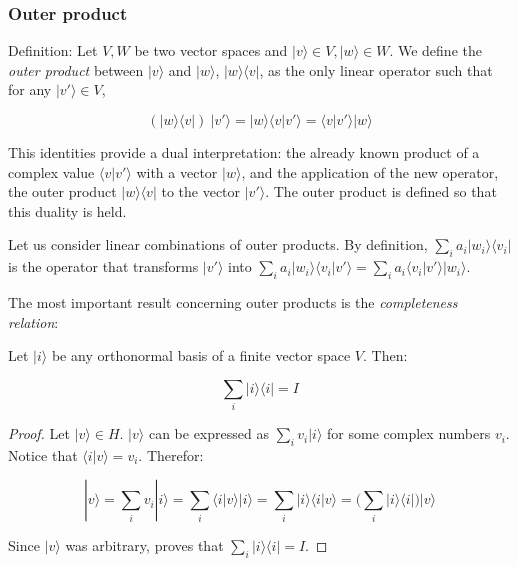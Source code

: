 \documentclass{article}
\begin{document}
	
	\subsubsection{Outer product}
	
	
	\begin{definition}
		Definition: Let $V, W$ be two vector spaces and $|v\rangle \in V, |w\rangle \in W$. We define the \emph{outer product} between $|v\rangle$ and $|w\rangle$, $|w\rangle\langle v|$, as the only linear operator such that for any $|v'\rangle \in V$, 
		
		$$ (|w\rangle\langle v|) \ |v'\rangle = |w\rangle\langle v|v'\rangle = \langle v|v'\rangle |w\rangle$$
	\end{definition}
	
	This identities provide a dual interpretation: the already known product of a complex value $\langle v|v'\rangle$ with a vector $|w\rangle$, and the application of the new operator, the outer product $|w\rangle\langle v|$ to the vector $|v'\rangle$. The outer product is defined so that this duality is held.
	
	Let us consider linear combinations of outer products. By definition, $\sum_i a_i |w_i\rangle\langle v_i|$ is the operator that transforms $|v'\rangle$ into $\sum_i a_i |w_i\rangle\langle v_i|v'\rangle = \sum_i a_i \langle v_i|v'\rangle |w_i\rangle$.
	
	The most important result concerning outer products is the \emph{completeness relation}:
	
	\begin{proposition}
		Let $|i\rangle$ be any orthonormal basis of a finite vector space $V$. Then:
		
		$$ \sum_i |i\rangle\langle i | = I $$
	\end{proposition}
	
	\begin{proof}
		Let $|v\rangle \in H$. $|v\rangle$ can be expressed as $ \sum_i v_i |i\rangle$ for some complex numbers $v_i$. Notice that $\langle i|v\rangle = v_i$. Therefor:
		
		$$|v\rangle = \sum_i v_i |i\rangle = \sum_i \langle i|v\rangle |i\rangle = \sum_i |i\rangle\langle i|v\rangle = \bigg( \sum_i |i\rangle\langle i|\bigg) |v\rangle$$
		
		Since $|v\rangle$ was arbitrary, proves that $ \sum_i |i\rangle\langle i | = I $.
	\end{proof}
	
	\begin{corollary}
		
	\end{corollary}
	
\end{document}
